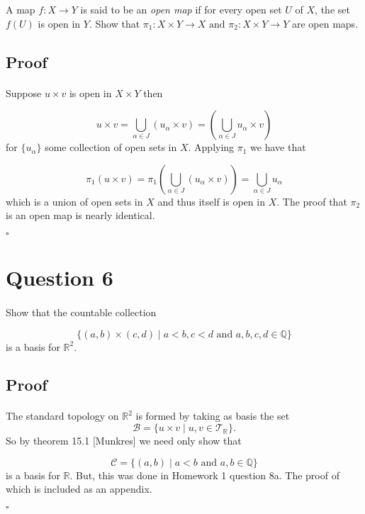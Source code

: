 \documentclass[11pt, oneside]{article}   	%
\newcommand{\R}{\mathbb{R}}
\newcommand{\bb}[1]{\mathbb{#1}}
\newcommand{\scr}[1]{\mathscr{#1}}
\newcommand{\tand}{\text{ and }}
\newcommand{\qed}{\begin{center}
$\square$
\end{center}}
\newcommand{\st}{\mid}
\begin{document}
A map $f:X \rightarrow Y$ is said to be an \emph{open map} if for every open set $U$ of $X$, the set $f(U)$ is open in $Y$. Show that $\pi_1:X \times Y \rightarrow X \tand \pi_2:X \times Y \rightarrow Y$ are open maps.

\subsection*{Proof}
\paragraph{}

Suppose $u \times v$ is open in $X \times Y$ then 

\[
u \times v = \bigcup_{\alpha \in J}(u_{\alpha} \times v) = (\bigcup_{\alpha \in J}u_{\alpha} \times v)
\]
for $\{u_{\alpha}\}$ some collection of open sets in $X$. Applying $\pi_1$ we have that

\[
\pi_1(u \times v) = \pi_1(\bigcup_{\alpha \in J}(u_{\alpha} \times v)) = \bigcup_{\alpha \in J}u_{\alpha}
\]
which is a union of open sets in $X$ and thus itself is open in $X$. The proof that $\pi_2$ is an open map is nearly identical. \qed 


\section*{Question 6}
\paragraph{}

Show that the countable collection

\[
\{(a,b) \times (c,d) \st a < b, c<d \tand a,b,c,d \in \bb{Q} \}
\]
is a basis for $\R^2$.

\subsection*{Proof}
\paragraph{}

The standard topology on $\R^2$ is formed by taking as basis the set 
\[
\scr{B} = \{u \times v \st u,v \in \scr{T}_\R \}.
\]
So by theorem 15.1 [Munkres] we need only show that 

\[
\scr{C} = \{ (a,b) \st a<b \tand a,b \in \bb{Q} \}
\]
is a basis for $\R$. But, this was done in Homework 1 question 8a. The proof of which is included as an appendix. \qed
\end{document}
